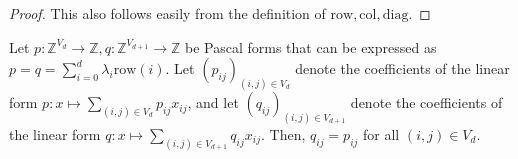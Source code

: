   \begin{proof}
    This also follows easily from the definition of $\mathrm{row}, \mathrm{col}, \mathrm{diag}$. 
  \end{proof}
  

\begin{proposition}\label{prop:row_extend_d}
    Let \( p : \mathbb{Z}^{V_d} \to \mathbb{Z},  q: \mathbb{Z}^{V_{d+1}} \to \mathbb{Z}  \) be Pascal forms that can be expressed as \( p = q = \sum_{i=0}^{d}  \lambda_{i} \mathrm{row}(i) \). Let \( (p_{ij})_{(i,j) \in V_d} \) denote the coefficients of the linear form \( p: x \mapsto \sum_{(i,j) \in V_d} p_{ij}x_{ij} \), and let \( (q_{ij})_{(i,j) \in V_{d+1}} \) denote the coefficients of the linear form \( q: x \mapsto \sum_{(i,j) \in V_{d+1}} q_{ij}x_{ij} \). Then, \( q_{ij} = p_{ij} \) for all \( (i,j) \in V_d \).
    

\end{proposition}
